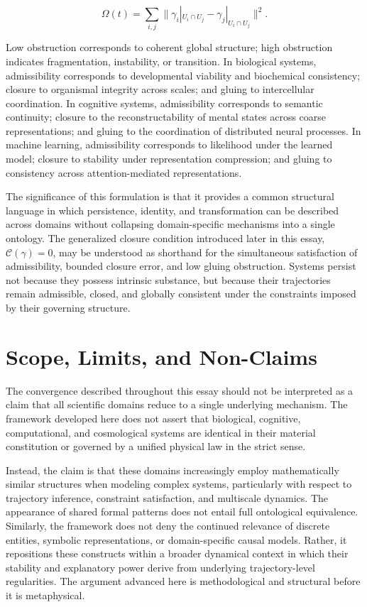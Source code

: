 \documentclass[12pt,a4paper]{article}
\begin{document}
\[
\Omega(t) = \sum_{i,j} \|\gamma_i|_{U_i \cap U_j} - \gamma_j|_{U_i \cap U_j}\|^2.
\]

Low obstruction corresponds to coherent global structure; high obstruction indicates
fragmentation, instability, or transition. In biological systems, admissibility
corresponds to developmental viability and biochemical consistency; closure to
organismal integrity across scales; and gluing to intercellular coordination. In
cognitive systems, admissibility corresponds to semantic continuity; closure to the
reconstructability of mental states across coarse representations; and gluing to
the coordination of distributed neural processes. In machine learning, admissibility
corresponds to likelihood under the learned model; closure to stability under
representation compression; and gluing to consistency across attention-mediated
representations.

The significance of this formulation is that it provides a common structural language
in which persistence, identity, and transformation can be described across domains
without collapsing domain-specific mechanisms into a single ontology. The generalized
closure condition introduced later in this essay, $\mathcal{C}(\gamma) = 0$, may be
understood as shorthand for the simultaneous satisfaction of admissibility, bounded
closure error, and low gluing obstruction. Systems persist not because they possess
intrinsic substance, but because their trajectories remain admissible, closed, and
globally consistent under the constraints imposed by their governing structure.

\section{Scope, Limits, and Non-Claims}

The convergence described throughout this essay should not be interpreted as a claim
that all scientific domains reduce to a single underlying mechanism. The framework
developed here does not assert that biological, cognitive, computational, and
cosmological systems are identical in their material constitution or governed by a
unified physical law in the strict sense.

Instead, the claim is that these domains increasingly employ mathematically similar
structures when modeling complex systems, particularly with respect to trajectory
inference, constraint satisfaction, and multiscale dynamics. The appearance of shared
formal patterns does not entail full ontological equivalence. Similarly, the framework
does not deny the continued relevance of discrete entities, symbolic representations,
or domain-specific causal models. Rather, it repositions these constructs within a
broader dynamical context in which their stability and explanatory power derive from
underlying trajectory-level regularities. The argument advanced here is methodological
and structural before it is metaphysical.
\end{document}
